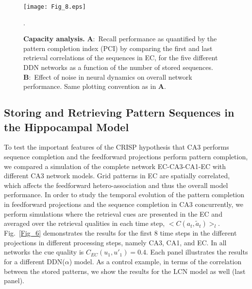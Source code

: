 \documentclass[utf8]{frontiersSCNS} %
\begin{document}
\begin{figure}[!htb]
\centering\texttt{[image: Fig\_8.eps]}
\caption{\textbf{Capacity analysis.} 
\textbf{A}:~Recall performance as quantified by the pattern completion index (PCI) by comparing the first and last retrieval correlations of the sequences in EC, for the five different DDN networks as a function of the number of stored sequences. 
\textbf{B}:~Effect of noise in neural dynamics on overall network performance.
Same plotting convention as in \textbf{A}.
}.   
\label{Fig_8}
\end{figure}


\subsection{Storing and Retrieving Pattern Sequences in the Hippocampal Model}




To test the important features of the CRISP hypothesis that CA3 performs sequence completion and the feedforward projections perform pattern completion, we compared a simulation of the complete network EC-CA3-CA1-EC with different CA3 network models.
%
Grid patterns in EC are spatially correlated, which affects the feedforward hetero-association and thus the overall model performance. 
%
In order to study the temporal evolution of the pattern completion in feedforward projections and the sequence completion in CA3 concurrently,  we perform simulations where the retrieval cues are presented in the EC and averaged over the retrieval qualities in each time step, $<C(a_t, \tilde{a}_t)>_l$.
%
Fig.~\ref{Fig_6} demonstrates the results for the first 8 time steps in the different projections in different processing steps, namely CA3, CA1, and EC. In all networks the cue quality is $C_{EC}(u_1, u'_1) = 0.4$.
%
Each panel illustrates the results for a different DDN($\alpha$) model. As a control example, in terms of the correlation between the stored patterns, we show the results for the LCN model as well (last panel). 
%
\end{document}

